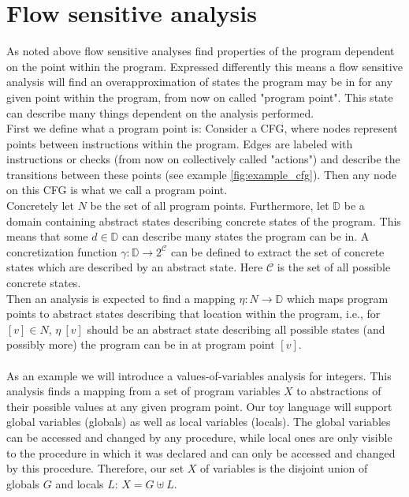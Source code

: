   \section{Flow sensitive analysis}
    As noted above flow sensitive analyses find properties of the program dependent on the point within the program. Expressed differently this means a flow sensitive analysis will find an overapproximation of states the program may be in for any given point within the program, from now on called "program point". This state can describe many things dependent on the analysis performed.\\
    First we define what a program point is: Consider a \ac{CFG}, where nodes represent points between instructions within the program. Edges are labeled with instructions or checks (from now on collectively called "actions") and describe the transitions between these points (see example \autoref{fig:example_cfg}). Then any node on this \ac{CFG} is what we call a program point.\\
    Concretely let $N$ be the set of all program points. Furthermore, let $\mathbb{D}$ be a domain containing abstract states describing concrete states of the program. This means that some $d \in \mathbb{D}$ can describe many states the program can be in. A concretization function $\gamma: \mathbb{D} \rightarrow 2^{\mathcal{C}}$ can be defined to extract the set of concrete states which are described by an abstract state. Here $\mathcal{C}$ is the set of all possible concrete states.\\ 
    Then an analysis is expected to find a mapping $\eta: N \rightarrow \mathbb{D}$ which maps program points to abstract states describing that location within the program, i.e., for $[v] \in N$, $\eta\ [v]$ should be an abstract state describing all possible states (and possibly more) the program can be in at program point $[v]$.\\
    \\
    As an example we will introduce a values-of-variables analysis for integers. This analysis finds a mapping from a set of program variables $X$ to abstractions of their possible values at any given program point. Our toy language will support global variables (globals) as well as local variables (locals). The global variables can be accessed and changed by any procedure, while local ones are only visible to the procedure in which it was declared and can only be accessed and changed by this procedure. Therefore, our set $X$ of variables is the disjoint union of globals $G$ and locals $L$: $X = G \uplus L$.
